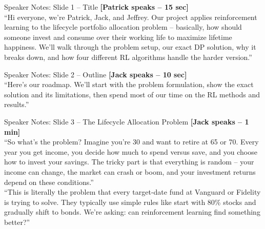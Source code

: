 \documentclass[aspectratio=169, 11pt]{beamer}
\begin{document}
\appendix


\begin{frame}[allowframebreaks]{Speaker Notes: Slide 1 -- Title}
\textbf{[Patrick speaks -- 15 sec]}\\
``Hi everyone, we're Patrick, Jack, and Jeffrey. Our project applies reinforcement learning to the lifecycle portfolio allocation problem -- basically, how should someone invest and consume over their working life to maximize lifetime happiness. We'll walk through the problem setup, our exact DP solution, why it breaks down, and how four different RL algorithms handle the harder version.''
\end{frame}

\begin{frame}[allowframebreaks]{Speaker Notes: Slide 2 -- Outline}
\textbf{[Jack speaks -- 10 sec]}\\
``Here's our roadmap. We'll start with the problem formulation, show the exact solution and its limitations, then spend most of our time on the RL methods and results.''
\end{frame}

\begin{frame}[allowframebreaks]{Speaker Notes: Slide 3 -- The Lifecycle Allocation Problem}
\textbf{[Jack speaks -- 1 min]}\\
``So what's the problem? Imagine you're 30 and want to retire at 65 or 70. Every year you get income, you decide how much to spend versus save, and you choose how to invest your savings. The tricky part is that everything is random -- your income can change, the market can crash or boom, and your investment returns depend on these conditions.''\\[0.5em]
``This is literally the problem that every target-date fund at Vanguard or Fidelity is trying to solve. They typically use simple rules like start with 80\% stocks and gradually shift to bonds. We're asking: can reinforcement learning find something better?''
\end{frame}
\end{document}
